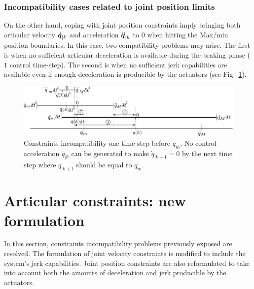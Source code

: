 \documentclass[a4paper, 10pt, conference]{ieeeconf}      %
\newcommand{\vect}[1]{\mbox{\boldmath${#1}$}}%
\begin{document}
\subsubsection{Incompatibility cases related to joint position limits}
On the other hand, coping with joint position constraints imply bringing both articular velocity $\vect{\dot{q}}_{|k}$ and acceleration $\vect{\ddot{q}}_{|k}$ to $0$ when hitting the Max/min position boundaries. In this case, two compatibility problems may arise. The first is when no sufficient articular deceleration is available during the braking phase ($1$ control time-step). The second is when no sufficient jerk capabilities are available even if enough deceleration is producible by the actuators (see Fig.~\ref{fig:Constraints_incompatibility4}).
%
\begin{figure}
\centering
\includegraphics[width=2.0\columnwidth]{figures/Constraints_incompatibility4}
\caption{Constraints incompatibility one time step before $q_m$. No control acceleration $\ddot{q}_{|k}$ can be generated to make $\dot{q}_{|k+1} = 0$ by the next time step where $q_{|k+1}$ should be equal to $q_m$.}
\label{fig:Constraints_incompatibility4}
\end{figure}

\section{Articular constraints: new formulation}
In this section, constraints incompatibility problems previously exposed are resolved. The formulation of joint velocity constraints is modified to include the system's jerk capabilities. Joint position constraints are also reformulated to take into account both the amounts of deceleration and jerk producible by the actuators.
\end{document}
